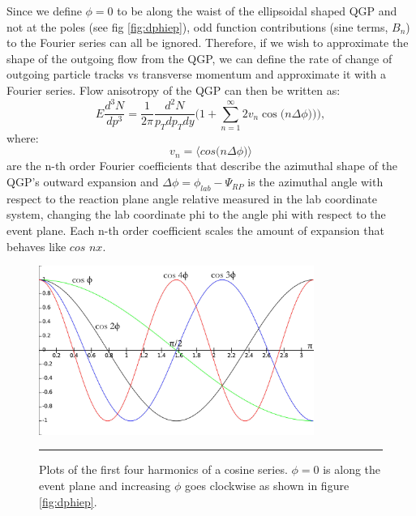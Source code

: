 Since we define $\phi=0$ to be along the waist of the ellipsoidal shaped QGP and not at the poles (see fig \ref{fig:dphiep}), odd function contributions (sine terms, $B_{n}$) to the Fourier series can all be ignored. Therefore, if we wish to approximate the shape of the outgoing flow from the QGP, we can define the rate of change of outgoing particle tracks vs transverse momentum and approximate it with a Fourier series. Flow anisotropy of the QGP can then be written as:
\begin{equation}
E \frac{d^{3}N}{dp^{3}} = \frac{1}{2 \pi} \frac{d^{2}N}{p_{T} dp_{T}dy}\Big( 1 + \sum^{\infty}_{n=1} 2 v_{n} \cos\big(n \Delta \phi)\big) \Big),
\end{equation}
where:
\begin{equation}
v_{n} = \bigg \langle cos \Big( n \Delta\phi \Big) \bigg \rangle
\end{equation}
are the n-th order Fourier coefficients that describe the azimuthal shape of the QGP's outward expansion and $\Delta \phi = \phi_{lab} - \Psi_{RP}$ is the azimuthal angle with respect to the reaction plane angle relative measured in the lab coordinate system, changing the lab coordinate phi to the angle phi with respect to the event plane. Each n-th order coefficient scales the amount of expansion that behaves like $cos$ $nx$.

\begin{figure}[htbp!]
  \centering
    \includegraphics[width=0.8\textwidth]{Figures/fouriercosines.jpg}
    \rule{35em}{0.5pt}
  \caption[Plots of the first four harmonics of a cosine series.]{Plots of the first four harmonics of a cosine series. $\phi=0$ is along the event plane and increasing $\phi$ goes clockwise as shown in figure \ref{fig:dphiep}.}
  \label{fig:fouriercosines}
\end{figure}

